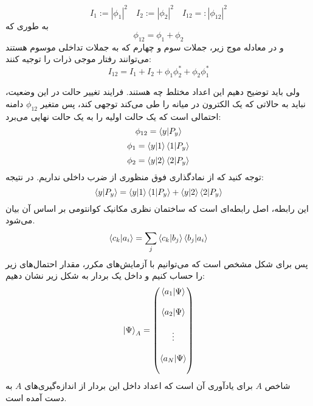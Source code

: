  
\begin{equation}
	I_{1} := |\phi_{1}|^{2} \quad I_{2} := |\phi_{2}|^{2} \quad I_{12} =: |\phi_{12}|^{2}
\end{equation}
به طوری که 
\begin{equation}
	\phi_{12} = \phi_{1} + \phi_{2}
\end{equation}
و در معادله موج زیر، جملات سوم و چهارم که به جملات تداخلی موسوم هستند می‌توانند رفتار موجی ذرات را توجیه کنند:
 \begin{equation}
 	I_{12} = I_{1} + I_{2} + \phi_{1}\phi^{*}_{2} + \phi_{2}\phi^{*}_{1}
 \end{equation}
 
 ولی باید توضیح دهیم این اعداد مختلط چه هستند. فرایند تغییر حالت در این وضعیت، نباید به حالاتی که یک الکترون در میانه را طی می‌کند توجهی کند، پس متغیر $\phi_{12}$ دامنه احتمالی است که یک حالت اولیه را به یک حالت نهایی می‌برد:
  \begin{equation}
  	\phi_{12} = \braket{y}{P_{y}}
  \end{equation}
    \begin{equation}
  	\phi_{1} = \braket{y}{1}\braket{1}{P_{y}}
  \end{equation}
    \begin{equation}
  	\phi_{2} = \braket{y}{2}\braket{2}{P_{y}}
  \end{equation}
  توجه کنید که از نمادگذاری فوق منظوری از ضرب داخلی نداریم. در نتیجه:
   \begin{equation}
   		\braket{y}{P_{y}} = \braket{y}{1}\braket{1}{P_{y}} + \braket{y}{2}\braket{2}{P_{y}}
   \end{equation}
    این رابطه، اصل رابطه‌ای است که ساختمان نظری مکانیک کوانتومی بر اساس آن بیان می‌شود.
    \begin{equation}
    	\braket{c_{k}}{a_{i}} = \sum_{j} \braket{c_{k}}{b_{j}}\braket{b_{j}}{a_{i}}
    \end{equation}
    پس برای شکل مشخص است که می‌توانیم با آزمایش‌های مکرر، مقدار احتمال‌های زیر را حساب کنیم و داخل یک بردار به شکل زیر نشان دهیم:
    \begin{equation}
    	\ket{\Psi}_{A} = \begin{pmatrix}
    	\braket{a_{1}}{\Psi} \\ \\
    	\braket{a_{2}}{\Psi} \\ \\
    	\vdots \\ \\
    	\braket{a_{N}}{\Psi} \\ \\
    	\end{pmatrix}
    \end{equation}
    شاخص $A$ برای یادآوری آن است که اعداد داخل این بردار از اندازه‌گیری‌های $A$ به دست آمده است. 
    
